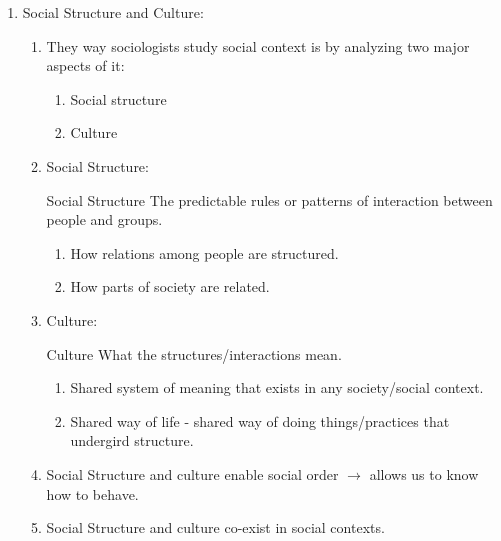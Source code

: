 \documentclass[12pt,a4paper]{article}
\begin{document}
\begin{enumerate}
	\item Social Structure and Culture: 
	\begin{enumerate}
		\item They way sociologists study social context is by analyzing two major aspects of it: 
		\begin{enumerate}
			\item Social structure
			\item Culture
		\end{enumerate}
		\item Social Structure: 
		\begin{df}{Social Structure}
			The predictable rules or patterns of interaction between people and groups.
		\end{df}
		\begin{enumerate}
			\item How relations among people are structured.
			\item How parts of society are related. 
		\end{enumerate}
		\item Culture: 
		\begin{df}{Culture}
			What the structures/interactions mean.
		\end{df}
		\begin{enumerate}
			\item Shared system of meaning that exists in any society/social context.
			\item Shared way of life - shared way of doing things/practices that undergird structure. 
		\end{enumerate}
		\item Social Structure and culture enable social order $\rightarrow$ allows us to know how to behave. 
		\item Social Structure and culture co-exist in social contexts. 
	\end{enumerate}
\end{enumerate}
\end{document}
